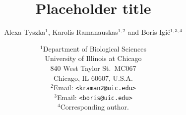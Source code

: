 \documentclass[11pt,letterpaper,titlepage]{article}
\begin{document}
\title{\Large\bf{Placeholder title}}
\author{Alexa Tyszka$^{1}$, Karolis Ramanauskas$^{1,2}$ and Boris Igi\'{c}$^{1,3,4}$}
\date{
    $^1$Department of Biological Sciences\\
    University of Illinois at Chicago\\
    840 West Taylor St.\ MC067\\
    Chicago, IL 60607, U.S.A.\\
    [\baselineskip]
    $^2$Email: {\tt<kraman2@uic.edu>}\\
    $^3$Email: {\tt<boris@uic.edu>}\\
    $^4$Corresponding author.\\
}
\maketitle




\end{document}
